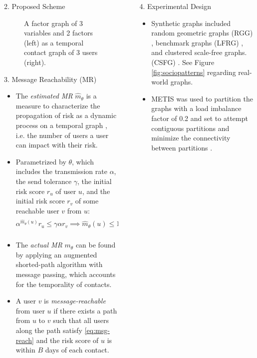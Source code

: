 \documentclass[final]{beamer}
\newlength{\sepwidth}
\newlength{\colwidth}
\newcommand{\separatorcolumn}{\begin{column}{\sepwidth}\end{column}}
\newcommand{\sval}{r}
\newcommand{\reach}{m_{\theta}}
\newcommand{\estreach}{\hat{m}_{\theta}}
\begin{document}
\begin{frame}[t]
\begin{columns}[t]
\begin{column}{\colwidth}
\begin{block}{2. Proposed Scheme}
\begin{figure}
{
			}%
			\caption{A factor graph of 3 variables and 2 factors (left) as a temporal contact graph of 3 users (right).}
			\label{fig:temporal-graph}
		\end{figure}
	\end{block}
	\begin{block}{3. Message Reachability (MR)}
		\begin{itemize}
			\item The \emph{estimated MR} $\estreach$ is a measure to characterize the propagation of risk as a dynamic process on a temporal graph \cite{Barrat2013}, i.e. the number of users a user can impact with their risk.
			\item Parametrized by $\theta$, which includes the transmission rate $\alpha$, the send tolerance $\gamma$, the initial risk score $r_u$ of user $u$, and the initial risk score $r_v$ of some reachable user $v$ from $u$:
				\begin{equation} \label{eq:msg-reach}
					 \alpha^{\estreach(u)} \sval_u \leq \gamma \alpha \sval_v \implies \estreach(u)
					 	\leq 1 + \log_{\alpha}\left(\frac{\gamma \sval_v}{\sval_u}\right)
				\end{equation}
			\item The \emph{actual MR} $\reach$ can be found by applying an augmented shorted-path algorithm with message passing, which accounts for the temporality of contacts.
			\item A user $v$ is \emph{message-reachable} from user $u$ if there exists a path from $u$ to $v$ such that all users along the path satisfy \eqref{eq:msg-reach} and the risk score of $u$ is within $B$ days of each contact.
		\end{itemize}
	\end{block}
\end{column}
\separatorcolumn
\begin{column}{\colwidth}
	\begin{block}{4. Experimental Design}
		\begin{itemize}
			\item Synthetic graphs included random geometric graphs (RGG) \cite{Dall2002}, benchmark graphs (LFRG) \cite{Lancichinetti2008}, and clustered scale-free graphs. (CSFG) \cite{Holme2002}. See Figure \ref{fig:sociopatterns} regarding real-world graphs.
			\item METIS was used to partition the graphs with a load imbalance factor of 0.2 and set to attempt contiguous partitions and minimize the connectivity between partitions \cite{Karypis1998}.

\end{itemize}
\end{block}
\end{column}
\end{columns}
\end{frame}
\end{document}
